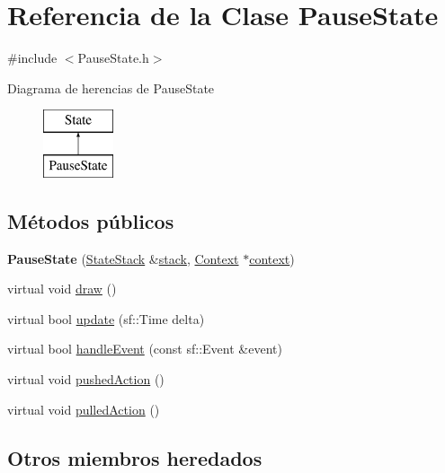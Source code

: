 \hypertarget{classPauseState}{}\section{Referencia de la Clase Pause\+State}
\label{classPauseState}


{\ttfamily \#include $<$Pause\+State.\+h$>$}

Diagrama de herencias de Pause\+State\begin{figure}[H]
\begin{center}
\leavevmode
\includegraphics[height=2.000000cm]{classPauseState}
\end{center}
\end{figure}
\subsection*{Métodos públicos}
\begin{DoxyCompactItemize}
\item 
\hypertarget{classPauseState_a29710f2868096d4c7baccd7497f17a13}{}{\bfseries Pause\+State} (\hyperlink{classStateStack}{State\+Stack} \&\hyperlink{classState_a86c8d3a5a1ee89896828be85a785fb04}{stack}, \hyperlink{classContext}{Context} $\ast$\hyperlink{classState_adc93e8ad3199b5891618ca88eed0436a}{context})\label{classPauseState_a29710f2868096d4c7baccd7497f17a13}

\item 
virtual void \hyperlink{classPauseState_ac4c159c2f6d32eedd351f39e36c43f9d}{draw} ()
\item 
virtual bool \hyperlink{classPauseState_aed5aa4149e29b9124ade7a76a63941cd}{update} (sf\+::\+Time delta)
\item 
virtual bool \hyperlink{classPauseState_a685dda66dca3e1c41f4cb02da93c5a8d}{handle\+Event} (const sf\+::\+Event \&event)
\item 
virtual void \hyperlink{classPauseState_aa20ec5df0044a9652df788b9ad1aafb9}{pushed\+Action} ()
\item 
virtual void \hyperlink{classPauseState_ac04578f84a4c4fbcdf2d8b963b5f9fd0}{pulled\+Action} ()
\end{DoxyCompactItemize}
\subsection*{Otros miembros heredados}


